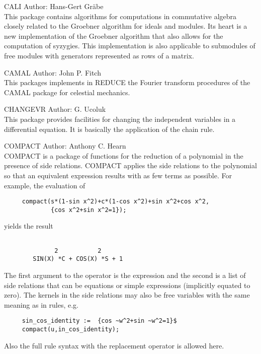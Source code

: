 \begin{Package}{CALI}
Author: Hans-Gert Gr{\"a}be \\

This package contains algorithms for computations in commutative algebra
closely related to the Groebner algorithm for ideals and modules.  Its
heart is a new implementation of the Groebner algorithm that also allows
for the computation of syzygies.  This implementation is also applicable to
submodules of free modules with generators represented as rows of a matrix.
\end{Package}

\begin{Package}{CAMAL}
Author: John P. Fitch\\

This packages implements in REDUCE the Fourier transform procedures of the
CAMAL package for celestial mechanics.
\end{Package}

\begin{Package}{CHANGEVR}
Author: G. Ucoluk\\

This package provides facilities for changing the independent variables in
a differential equation. It is basically the application of the chain rule.
\end{Package}

\begin{Package}{COMPACT}
Author: Anthony C. Hearn\\

COMPACT is a package of functions for the reduction of a polynomial in the
presence of side relations.  COMPACT applies the side relations to the
polynomial so that an equivalent expression results with as few terms as
possible.  For example, the evaluation of

\begin{verbatim}
     compact(s*(1-sin x^2)+c*(1-cos x^2)+sin x^2+cos x^2,
             {cos x^2+sin x^2=1});

\end{verbatim}
yields the result
\begin{verbatim}

              2           2
        SIN(X) *C + COS(X) *S + 1
\end{verbatim}

The first argument to the operator  is the expression
and the second is a list of side relations that can be
equations or simple expressions (implicitly equated to zero). The
kernels in the side relations may also be free variables with the
same meaning as in rules, e.g.
\begin{verbatim}
     sin_cos_identity :=  {cos ~w^2+sin ~w^2=1}$
     compact(u,in_cos_identity);
\end{verbatim}
Also the full rule syntax with the replacement operator is allowed here.
\end{Package}                 

